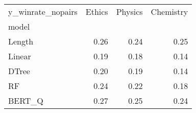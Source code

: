 \begin{tabular}{lrrr}
\toprule
y\_winrate\_nopairs &  Ethics &  Physics &  Chemistry \\
model  &         &          &            \\
\midrule
Length &    0.26 &     0.24 &       0.25 \\
Linear &    0.19 &     0.18 &       0.14 \\
DTree  &    0.20 &     0.19 &       0.14 \\
RF     &    0.24 &     0.22 &       0.18 \\
BERT\_Q &    0.27 &     0.25 &       0.24 \\
\bottomrule
\end{tabular}
